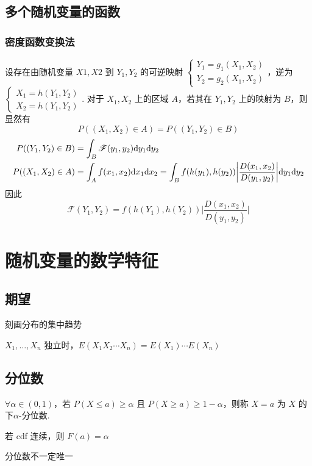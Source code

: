 \documentclass[./main.tex]{subfiles}
\begin{document}
\subsection{多个随机变量的函数}
\subsubsection{密度函数变换法}
设存在由随机变量 $X1,X2$ 到 $Y_1,Y_2$ 的可逆映射 $\begin{cases}Y_1=g_1(X_1,X_2)\\Y_2=g_2(X_1,X_2)\end{cases}$，逆为 $\begin{cases}X_1=h(Y_1,Y_2)\\X_2=h(Y_1,Y_2)\end{cases}$. 对于 $X_1,X_2$ 上的区域 $A$，若其在 $Y_1,Y_2$ 上的映射为 $B$，则显然有 $$P((X_1,X_2)\in A)=P((Y_1,Y_2)\in B)$$
\begin{align*}
    P((Y_1,Y_2)\in B)&=\int_B\mathscr{F}(y_1,y_2)\text{d}y_1\text{d}y_2\\
    P((X_1,X_2)\in A)&=\int_Af(x_1,x_2)\text{d}x_1\text{d}x_2=\int_Bf(h(y_1),h(y_2))\bigg|\frac{D{(x_1,x_2)}}{D{(y_1,y_2)}}\bigg|\text{d}y_1\text{d}y_2
\end{align*}
因此
\begin{equation}
    \mathscr{F}(Y_1,Y_2)=f(h(Y_1),h(Y_2))\bigg|\frac{D{(x_1,x_2)}}{D{(y_1,y_2)}}\bigg|
\end{equation}
\section{随机变量的数学特征}
\subsection{期望}
\begin{enumerate*}
    \item 刻画分布的集中趋势
    \item $X_1,\dots,X_n$ 独立时，$E(X_1X_2\cdots X_n)=E(X_1)\cdots E(X_n)$
\end{enumerate*}
\subsection{分位数}
$\forall \alpha\in(0,1)$，若 $P(X\le a)\ge\alpha$ 且 $P(X\ge a)\ge 1-\alpha$，则称 $X=a$ 为 $X$ 的 \textbf{$\text{下}\alpha\text{-分位数}$}. 
\begin{enumerate*}
    \item 若 cdf 连续，则 $F(a)=\alpha$
    \item 分位数不一定唯一
\end{enumerate*}
\end{document}

